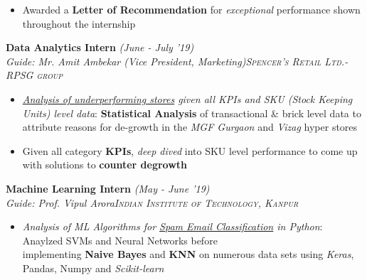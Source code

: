 \documentclass{article}
\begin{document}
\begin{itemize}[itemsep = -1 mm, leftmargin=*]
\begin{itemize}[itemsep = -0.6 mm, leftmargin=*]
    \end{itemize}
    \vspace{-3.5pt}
    \item Awarded a \textbf{Letter of Recommendation} for {\it exceptional} performance shown throughout the internship
\end{itemize}
\vspace{-2.5pt}
\hspace*{-15pt}\textbf{Data Analytics Intern} \hfill{\sl \small (June - July '19)}
\vspace{-1pt}\\
{\it Guide: Mr. Amit Ambekar (Vice President, Marketing)}\hfill{\sl \small \textsc{Spencer's Retail Ltd.- RPSG group}}\\
\vspace{-19pt}
\begin{itemize}[itemsep = -1 mm, leftmargin=*]
    \item {\it \underline {Analysis of underperforming stores} given all KPIs and SKU (Stock Keeping Units) level data}: {\bf Statistical Analysis} of transactional \& brick level data to attribute reasons for de-growth in the {\it MGF Gurgaon} and {\it Vizag} hyper stores
     \item Given all category {\bf KPIs}, {\it deep dived} into SKU level performance to come up with solutions to {\bf counter degrowth}
\end{itemize}
\vspace{-5pt}
\textbf{Machine Learning Intern} \hfill{\sl \small (May - June '19)}
\vspace{-1pt}\\
{\it Guide: Prof. Vipul Arora}\hfill{\sl \small \textsc{Indian Institute of Technology, Kanpur}}\\
\vspace{-19pt}
\begin{itemize}[itemsep = -1.25 mm, leftmargin=*]
    \item \textit{Analysis of ML Algorithms for \underline{Spam Email Classification} in Python}: Anaylzed SVMs and Neural Networks before\\implementing {\bf Naive Bayes} and {\bf KNN} on numerous data sets using {\it Keras}, Pandas, Numpy and {\it Scikit-learn}
\end{itemize}
\end{document}
